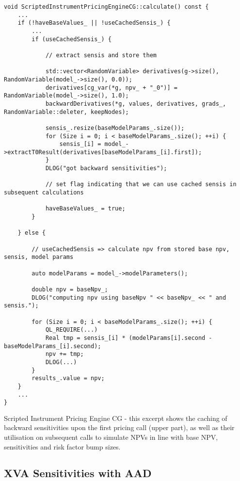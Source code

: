 \begin{listing}[hbt]
\begin{verbatim}
void ScriptedInstrumentPricingEngineCG::calculate() const {
    ...
    if (!haveBaseValues_ || !useCachedSensis_) {
        ...
        if (useCachedSensis_) {

            // extract sensis and store them

            std::vector<RandomVariable> derivatives(g->size(), RandomVariable(model_->size(), 0.0));
            derivatives[cg_var(*g, npv_ + "_0")] = RandomVariable(model_->size(), 1.0);
            backwardDerivatives(*g, values, derivatives, grads_, RandomVariable::deleter, keepNodes);

            sensis_.resize(baseModelParams_.size());
            for (Size i = 0; i < baseModelParams_.size(); ++i) {
                sensis_[i] = model_->extractT0Result(derivatives[baseModelParams_[i].first]);
            }
            DLOG("got backward sensitivities");

            // set flag indicating that we can use cached sensis in subsequent calculations

            haveBaseValues_ = true;
        }

    } else {

        // useCachedSensis => calculate npv from stored base npv, sensis, model params

        auto modelParams = model_->modelParameters();

        double npv = baseNpv_;
        DLOG("computing npv using baseNpv " << baseNpv_ << " and sensis.");

        for (Size i = 0; i < baseModelParams_.size(); ++i) {
            QL_REQUIRE(...)
            Real tmp = sensis_[i] * (modelParams[i].second - baseModelParams_[i].second);
            npv += tmp;
            DLOG(...)
        }
        results_.value = npv;
    }
    ...
}
\end{verbatim}
\caption{Scripted Instrument Pricing Engine CG - this excerpt shows the caching of backward
  sensitivities upon the first pricing call (upper part), as well as their utilisation on subsequent
  calls to simulate NPVs in line with base NPV, sensitivities and risk factor bump sizes.}
\label{lst:sensicache}
\end{listing}


\subsection{XVA Sensitivities with AAD}

